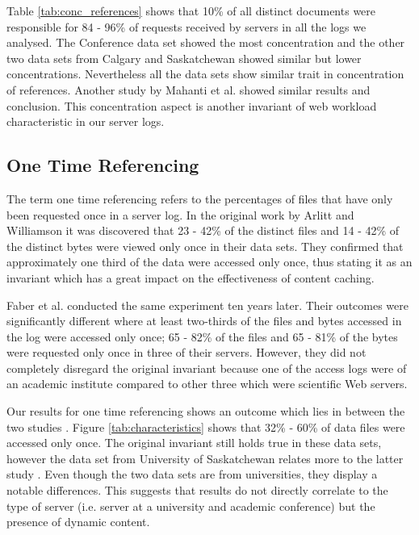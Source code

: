 \documentclass[10pt,conference]{IEEEtran}
\begin{document}
Table \ref{tab:conc_references} shows that 10\% of all distinct documents were responsible for 84 - 96\% of requests received by servers in all the logs we analysed. The Conference data set showed the most concentration and the other two data sets from Calgary and Saskatchewan showed similar but lower concentrations. Nevertheless all the data sets show similar trait in concentration of references. Another study by Mahanti et al.\cite{Mahanti} showed similar results and conclusion. This concentration aspect is another invariant of web workload characteristic in our server logs.

\subsection{One Time Referencing} %
\label{sub:one_time_referencing}
The term one time referencing refers to the percentages of files that have only been requested once in a server log. In the original work by Arlitt and Williamson \cite{invariants} it was discovered that 23 - 42\% of the distinct files and 14 - 42\% of the distinct bytes were viewed only once in their data sets. They confirmed that approximately one third of the data were accessed only once, thus stating it as an invariant which has a great impact on the effectiveness of content caching.

Faber et al. \cite{Faber} conducted the same experiment ten years later. Their outcomes were significantly different where at least two-thirds of the files and bytes accessed in the log were accessed only once; 65 - 82\% of the files and 65 - 81\% of the bytes were requested only once in three of their servers. However, they did not completely disregard the original invariant because one of the access logs were of an academic institute compared to other three which were scientific Web servers.

Our results for one time referencing shows an outcome which lies in between the two studies \cite{invariants, Faber}. Figure \ref{tab:characteristics} shows that 32\% - 60\% of data files were accessed only once. The original invariant still holds true in these data sets, however the data set from University of Saskatchewan relates more to the latter study \cite{Faber}. Even though the two data sets are from universities, they display a notable differences. This suggests that results do not directly correlate to the type of server (i.e. server at a university and academic conference) but the presence of dynamic content.
\end{document}
